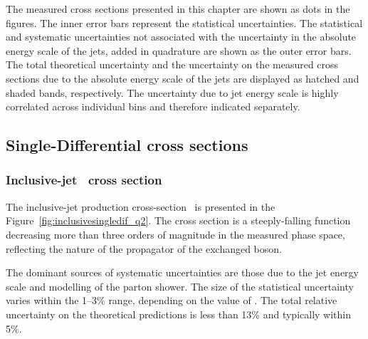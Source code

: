 The measured cross sections presented in this chapter are shown as dots in the figures. The inner error bars represent the statistical uncertainties. The statistical and systematic uncertainties not associated with the uncertainty in the absolute energy scale of the jets, added in quadrature are shown as the outer error bars. The total theoretical uncertainty and the uncertainty on the measured cross sections due to the absolute energy scale of the jets are displayed as hatched and shaded bands, respectively. The uncertainty due to jet energy scale is highly correlated across individual bins and therefore indicated separately.

\subsection{Single-Differential cross sections}
\subsubsection*{Inclusive-jet \dsdqsq~cross section}
The inclusive-jet production cross-section \dsdqsq~is presented in the Figure~\ref{fig:inclusivesingledif_q2}. The cross section is a steeply-falling function decreasing more than three orders of magnitude in the measured phase space, reflecting the nature of the propagator of the exchanged boson.

The dominant sources of systematic uncertainties are those due to the jet energy scale and modelling of the parton shower. The size of the statistical uncertainty varies within the 1--3\% range, depending on the value of \qsq. %
The total relative uncertainty on the theoretical predictions is less than 13\% and typically within 5\%. %

